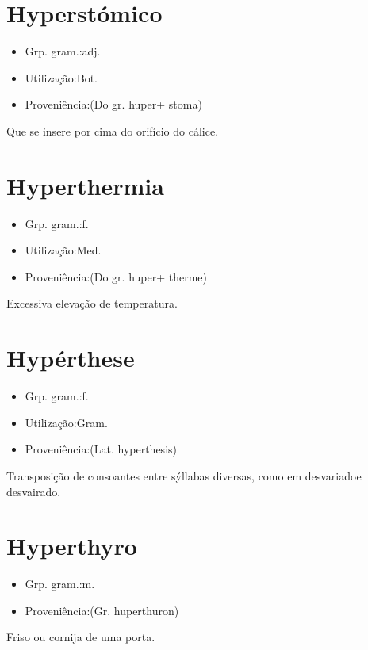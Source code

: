 \documentclass{article}
\begin{document}
\section{Hyperstómico}
\begin{itemize}
\item {Grp. gram.:adj.}
\end{itemize}
\begin{itemize}
\item {Utilização:Bot.}
\end{itemize}
\begin{itemize}
\item {Proveniência:(Do gr. \textunderscore huper\textunderscore  + \textunderscore stoma\textunderscore )}
\end{itemize}
Que se insere por cima do orifício do cálice.
\section{Hyperthermia}
\begin{itemize}
\item {Grp. gram.:f.}
\end{itemize}
\begin{itemize}
\item {Utilização:Med.}
\end{itemize}
\begin{itemize}
\item {Proveniência:(Do gr. \textunderscore huper\textunderscore  + \textunderscore therme\textunderscore )}
\end{itemize}
Excessiva elevação de temperatura.
\section{Hypérthese}
\begin{itemize}
\item {Grp. gram.:f.}
\end{itemize}
\begin{itemize}
\item {Utilização:Gram.}
\end{itemize}
\begin{itemize}
\item {Proveniência:(Lat. \textunderscore hyperthesis\textunderscore )}
\end{itemize}
Transposição de consoantes entre sýllabas diversas, como em \textunderscore desvariado\textunderscore  e \textunderscore desvairado\textunderscore .
\section{Hyperthyro}
\begin{itemize}
\item {Grp. gram.:m.}
\end{itemize}
\begin{itemize}
\item {Proveniência:(Gr. \textunderscore huperthuron\textunderscore )}
\end{itemize}
Friso ou cornija de uma porta.
\end{document}
